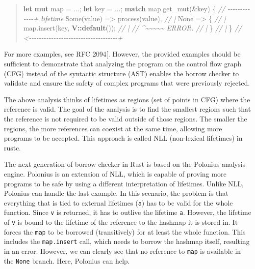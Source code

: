 \documentclass[
  11pt,
  twoside]{report}
\newenvironment{Shaded}{}{}
\newcommand{\CommentTok}[1]{\textit{#1}}
\newcommand{\ConstantTok}[1]{#1}
\newcommand{\ControlFlowTok}[1]{\textbf{#1}}
\newcommand{\KeywordTok}[1]{\textbf{#1}}
\newcommand{\NormalTok}[1]{#1}
\newcommand{\OperatorTok}[1]{#1}
\newcommand{\PreprocessorTok}[1]{\textbf{#1}}
\begin{document}
\begin{quote}
\begin{Shaded}
\begin{Highlighting}[]
\KeywordTok{let} \KeywordTok{mut}\NormalTok{ map }\OperatorTok{=} \OperatorTok{...;}
\KeywordTok{let}\NormalTok{ key }\OperatorTok{=} \OperatorTok{...;}
\ControlFlowTok{match}\NormalTok{ map}\OperatorTok{.}\NormalTok{get\_mut(}\OperatorTok{\&}\NormalTok{key) }\OperatorTok{\{} \CommentTok{// {-}{-}{-}{-}{-}{-}{-}{-}{-}{-}{-}{-}{-}+ \textquotesingle{}lifetime}
    \ConstantTok{Some}\NormalTok{(value) }\OperatorTok{=\textgreater{}}\NormalTok{ process(value)}\OperatorTok{,}     \CommentTok{// |}
    \ConstantTok{None} \OperatorTok{=\textgreater{}} \OperatorTok{\{}                          \CommentTok{// |}
\NormalTok{        map}\OperatorTok{.}\NormalTok{insert(key}\OperatorTok{,} \PreprocessorTok{V::}\KeywordTok{default}\NormalTok{())}\OperatorTok{;} \CommentTok{// |}
        \CommentTok{//  \^{}\textasciitilde{}\textasciitilde{}\textasciitilde{}\textasciitilde{}\textasciitilde{} ERROR.              // |}
    \OperatorTok{\}}                                  \CommentTok{// |}
\OperatorTok{\}} \CommentTok{// \textless{}{-}{-}{-}{-}{-}{-}{-}{-}{-}{-}{-}{-}{-}{-}{-}{-}{-}{-}{-}{-}{-}{-}{-}{-}{-}{-}{-}{-}{-}{-}{-}{-}{-}{-}{-}{-}+}
\end{Highlighting}
\end{Shaded}
\end{quote}

For more examples, see RFC 2094{[}\citeproc{ref-rfc2094nll}{7}{]}.
However, the provided examples should be sufficient to demonstrate that
analyzing the program on the control flow graph (CFG) instead of the
syntactic structure (AST) enables the borrow checker to validate and
ensure the safety of complex programs that were previously rejected.

The above analysis thinks of lifetimes as regions (set of points in CFG)
where the reference is valid. The goal of the analysis is to find the
smallest regions such that the reference is not required to be valid
outside of those regions. The smaller the regions, the more references
can coexist at the same time, allowing more programs to be accepted.
This approach is called NLL (non-lexical lifetimes) in rustc.

The next generation of borrow checker in Rust is based on the Polonius
analysis engine. Polonius is an extension of NLL, which is capable of
proving more programs to be safe by using a different interpretation of
lifetimes. Unlike NLL, Polonius can handle the last example. In this
scenario, the problem is that everything that is tied to external
lifetimes (\texttt{\textquotesingle{}a}) has to be valid for the whole
function. Since \texttt{v} is returned, it has to outlive the lifetime
\texttt{\textquotesingle{}a}. However, the lifetime of \texttt{v} is
bound to the lifetime of the reference to the hashmap it is stored in.
It forces the \texttt{map} to be borrowed (transitively) for at least
the whole function. This includes the \texttt{map.insert} call, which
needs to borrow the hashmap itself, resulting in an error. However, we
can clearly see that no reference to \texttt{map} is available in the
\texttt{None} branch. Here, Polonius can help.
\end{document}
